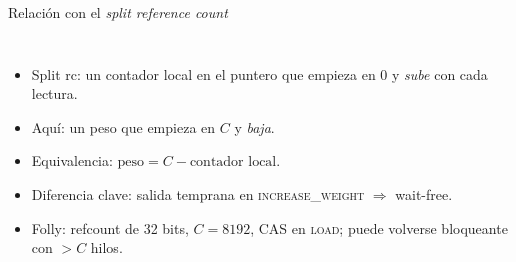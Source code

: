 \documentclass[aspectratio=169,11pt,xcolor=table]{beamer}
\begin{document}
\begin{frame}{Relación con el \emph{split reference count}}
  \begin{columns}[c]
    \begin{itemize}
      \item<1-> Split rc: un \alert{contador local} en el puntero que empieza en 0 y \emph{sube} con cada lectura.
      \item<2-> Aquí: un \alert{peso} que empieza en $C$ y \emph{baja}.
      \item<3-> Equivalencia: $\text{peso} = C - \text{contador local}$.
      \item<4-> Diferencia clave: \alert{salida temprana} en \textsc{increase\_weight} $\Rightarrow$ wait-free.
      \item<5-> Folly: refcount de 32 bits, $C=8192$, CAS en \textsc{load}; puede volverse bloqueante con $>C$ hilos.
    \end{itemize}
    \centering
  \end{columns}
\end{frame}
\end{document}
